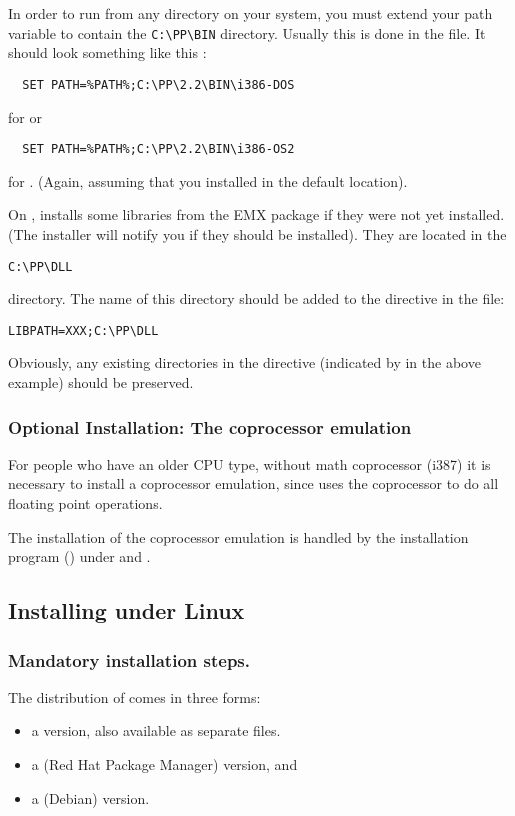 In order to run \fpc from any directory on your system, you must extend
your path variable to contain the \verb|C:\PP\BIN| directory.
Usually this is done in the  file.
It should look something like this :
\begin{verbatim}
  SET PATH=%PATH%;C:\PP\2.2\BIN\i386-DOS
\end{verbatim}
for \dos or 
\begin{verbatim}
  SET PATH=%PATH%;C:\PP\2.2\BIN\i386-OS2
\end{verbatim}
for \ostwo.
(Again, assuming that you installed in the default location).

On \ostwo, \fpc installs some libraries from the EMX package if they
were not yet installed. (The installer will notify you if they should be
installed). They are located in the 
\begin{verbatim}
C:\PP\DLL
\end{verbatim}
directory. The name of this directory should be added to the 
directive in the  file:
\begin{verbatim}
LIBPATH=XXX;C:\PP\DLL
\end{verbatim}
Obviously, any existing directories in the  directive
(indicated by  in the above example) should be preserved.

\subsubsection{Optional Installation: The coprocessor emulation}
For people who have an older CPU type, without math coprocessor (i387)
it is necessary to install a coprocessor emulation, since \fpc uses the
coprocessor to do all floating point operations.

The installation of the coprocessor emulation is handled by the
installation program () under \dos and \windows.

%
%
\subsection{Installing under Linux}
\subsubsection{Mandatory installation steps.}
The \linux distribution of \fpc comes in three forms:
\begin{itemize}
\item a  version, also available as separate files.
\item a  (Red Hat Package Manager) version, and
\item a  (Debian) version.
\end{itemize}

